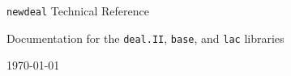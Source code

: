 \documentclass{report}
\begin{document}

\sbox{\cxxHeadName}{}

\begin{center}
  {\LARGE \texttt{newdeal} Technical Reference}

  {\Large Documentation for the \texttt{deal.II}, \texttt{base}, and
  \texttt{lac} libraries}

  \today
\end{center}


\tableofcontents
\end{document}
